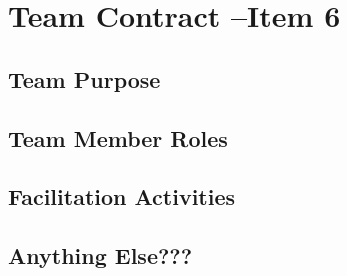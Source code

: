 \documentclass[titlepage]{article}
\begin{document}
\section{Team Contract --Item 6}

\subsection{Team Purpose}

\subsection{Team Member Roles}

\subsection{Facilitation Activities}

\subsection{Anything Else???}
\end{document}
